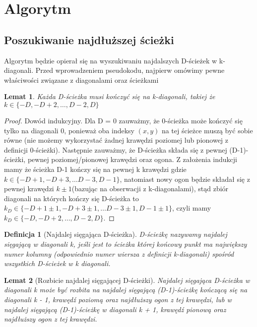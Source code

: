 \documentclass[12pt]{article}
\newtheorem*{definition}{Definicja}
\newtheorem*{lemma}{Lemat}
\begin{document}
\section{Algorytm}
\subsection{Poszukiwanie najdłuższej ścieżki}
Algorytm będzie opierał się na wyszukiwaniu najdalszych D-ścieżek w k-diagonali. Przed wprowadzeniem pseudokodu, najpierw omówimy pewne właściwości związane z diagonalami oraz ścieżkami

\begin{lemma}

Każda D-ścieżka musi kończyć się na k-diagonali, takiej że $k \in \{-D, -D + 2, \dots, D-2, D\}$
\end{lemma}

\begin{proof}
Dowód indukcyjny. Dla D = 0 zauważmy, że 0-ścieżka może kończyć się tylko na diagonali 0, ponieważ oba indeksy $(x,y)$ na tej ścieżce muszą być sobie równe (nie możemy wykorzystać żadnej krawędzi poziomej lub pionowej z definicji 0-ścieżki). Następnie zauważmy, że D-ścieżka składa się z pewnej (D-1)-ścieżki, pewnej poziomej/pionowej krawędzi oraz ogona. Z założenia indukcji mamy że ścieżka D-1 kończy się na pewnej k krawędzi gdzie $k \in \{ -D+1, -D + 3, \dots D -3, D - 1\}$, natomiast nowy ogon będzie składał się z pewnej krawędzi $k \pm 1$(bazując na obserwacji z k-diagonalami), stąd zbiór diagonali na których kończy się D-ścieżka to $k_{D} \in \{ -D + 1 \pm 1, -D + 3\pm 1, \dots D -3\pm 1, D - 1\pm 1\}$, czyli mamy $k_{D} \in \{ -D, -D + 2, \dots, D - 2, D\}$.
\end{proof}

\begin{definition}[Najdalej sięgająca D-ścieżka]
D-ścieżkę nazywamy najdalej sięgającą w diagonali k, jeśli jest to ścieżka której końcowy punkt ma największy numer kolumny (odpowiednio numer wiersza z definicji k-diagonali) spośród wszystkich D-ścieżek w k diagonali.
\end{definition}

\begin{lemma}[Rozbicie najdalej sięgającej D-ścieżki]
Najdalej sięgająca D-ścieżka w diagonali k może być rozbita na najdalej sięgającą (D-1)-ścieżkę kończącą się na diagonali k - 1, krawędź poziomą oraz najdłuższy ogon z tej krawędzi, lub w najdalej sięgającą (D-1)-ścieżkę w diagonali k + 1, krawędź pionową oraz najdłuższy ogon z tej krawędzi.
\end{lemma}
\end{document}
